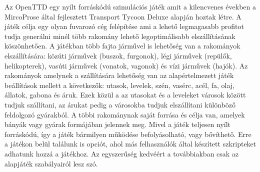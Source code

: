 

Az OpenTTD egy nyílt forráskódú szimulációs játék amit a kilencvenes években a MircoProse által fejlesztett Transport Tycoon Deluxe alapján hoztak létre. A játék célja egy olyan fuvarozó cég felépítése ami a lehető legmagasabb profitot tudja generálni minél több rakomány lehető legoptimálisabb elszállításának köszönhetően. A játékban több fajta járművel is lehetőség van a rakományok elszállítására: közúti járművek (buszok, furgonok), légi járművek (repülők, helikopterek), vasúti járművek (vonatok, vagonok) és vízi járművek (hajók). Az rakományok amelynek a szállítására lehetőség van az alapértelmezett játék beállítások mellett a következők: utasok, levelek, szén, vasérc, acél, fa, olaj, állatok, gabona és áruk. Ezek közül a az utasokat és a leveleket városok között tudjuk szállítani, az árukat pedig a városokba tudjuk elszállítani különböző feldolgozó gyárakból. A többi rakománynak saját forrása és célja van, amelyek bányák vagy gyárak formájában jelennek meg. Mivel a játék teljesen nyílt forráskódú, így a játék bármilyen működése befolyásolható, vagy bővíthető. Erre a játékon belül találunk is opciót, ahol más felhasználók által készített szkripteket adhatunk hozzá a játékhoz. Az egyszerűség kedvéért a továbbiakban csak az alapjáték szabályairól lesz szó.

